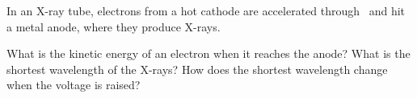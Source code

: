 In an X-ray tube, electrons from a hot cathode are accelerated through \UO\ and hit a metal anode, where they produce X-rays.

\begin{abcliste}
\abc What is the kinetic energy of an electron when it reaches the anode?
\abc What is the shortest wavelength of the X-rays?
\abc How does the shortest wavelength change when the voltage is raised?
\end{abcliste}

